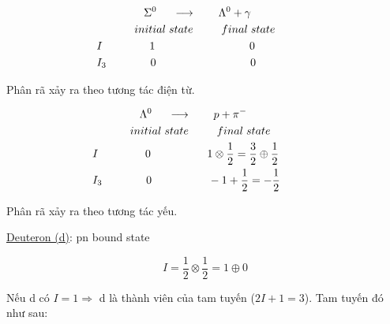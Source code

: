 \documentclass{report}
\begin{document}
	\begin{align*}
		& \hspace*{0.3cm} \Sigma^{0} \hspace*{0.5cm} \longrightarrow \hspace*{0.7cm} \Lambda^{0} + \gamma \\
		& initial \hspace*{0.1cm} state \hspace*{0.9cm} final \hspace*{0.1cm} state \\
		& \hspace*{-1.2cm} I \hspace*{1.5cm} 1  \hspace*{3cm} 0 \\
		& \hspace*{-1.2cm} I_{3} \hspace*{1.4cm} 0 \hspace*{3cm} 0
	\end{align*}
	
Phân rã xảy ra theo tương tác điện từ.

	\begin{align*}
		& \hspace*{0.3cm} \Lambda^{0} \hspace*{0.5cm} \longrightarrow \hspace*{0.7cm} p + \pi^{-} \\
		& initial \hspace*{0.1cm} state \hspace*{0.9cm} final \hspace*{0.1cm} state \\
		& \hspace*{-1.2cm} I \hspace*{1.5cm} 0  \hspace*{1.8cm} 1 \otimes  \frac{1}{2} = \frac{3}{2} \oplus \frac{1}{2} \\
		& \hspace*{-1.2cm} I_{3} \hspace*{1.4cm} 0 \hspace*{1.8cm} -1 + \frac{1}{2} = -\frac{1}{2}
	\end{align*}
	
Phân rã xảy ra theo tương tác yếu.

\underline{Deuteron (d)}: pn bound state

\[ I = \frac{1}{2} \otimes \frac{1}{2} = 1 \oplus 0 \]

Nếu d có \( I = 1 \Rightarrow\) d là thành viên của tam tuyến (\(2I+1=3\)). Tam tuyến đó như sau:
\end{document}
